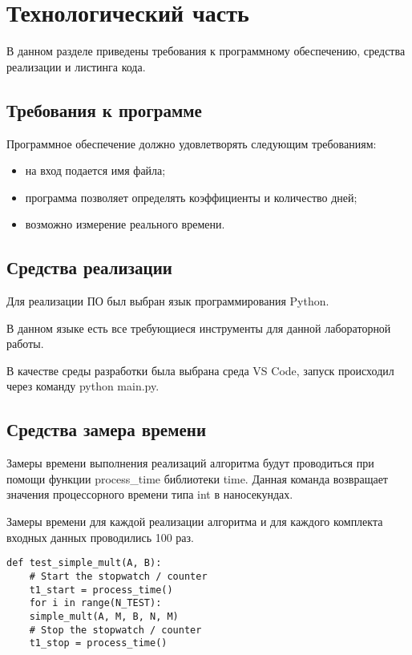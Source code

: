 \chapter{Технологический часть}

В данном разделе приведены требования к программному обеспечению, средства реализации и листинга кода.

\section{Требования к программе}

Программное обеспечение должно удовлетворять следующим требованиям:
\begin{itemize}
	\item на вход подается имя файла;
	\item программа позволяет определять коэффициенты и количество дней;
	\item возможно измерение реального времени.
\end{itemize}

\section{Средства реализации} 
Для реализации ПО был выбран язык программирования Python\cite{python}. 

В данном языке есть все требующиеся инструменты для данной лабораторной работы.

В качестве среды разработки была выбрана среда VS Code\cite{vscode}, запуск происходил через команду python main.py.

\section{Средства замера времени}

Замеры времени выполнения реализаций алгоритма будут проводиться при помощи функции process\_time \cite{test} библиотеки time. Данная команда возвращает значения процессорного времени типа int в наносекундах.

Замеры времени для каждой реализации алгоритма и для каждого комплекта входных данных проводились 100 раз.
\newpage
\begin{lstlisting}[label=bench,caption=Пример замера затраченного времени]
	def test_simple_mult(A, B):
	# Start the stopwatch / counter 
	t1_start = process_time() 
	for i in range(N_TEST):
	simple_mult(A, M, B, N, M)
	# Stop the stopwatch / counter
	t1_stop = process_time()
\end{lstlisting}


